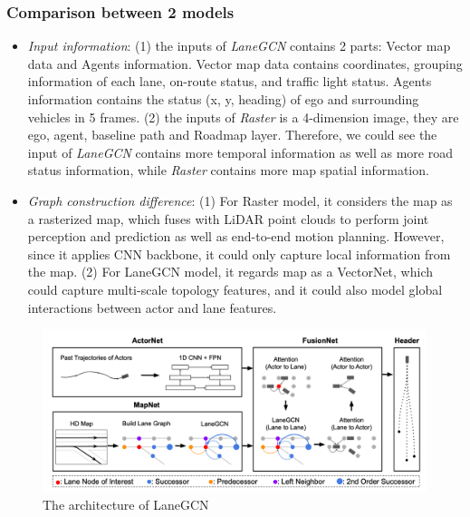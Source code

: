 \documentclass[10pt,conference,compsocconf]{IEEEtran}
\begin{document}
\subsubsection{Comparison between 2 models}

\begin{itemize}
    \item \emph{Input information}:
(1) the inputs of \emph{LaneGCN} contains 2 parts: Vector map data and Agents information. Vector map data contains coordinates, grouping information of each lane, on-route status, and traffic light status. Agents information contains the status (x, y, heading) of ego and surrounding 
vehicles in 5 frames. (2) the inputs of \emph{Raster} is a 4-dimension image, they are ego, agent, baseline path and Roadmap layer. Therefore, we could see the input of \emph{LaneGCN} contains more temporal information as well as more road status information, while \emph{Raster} contains more map spatial information.

\item \emph{Graph construction difference}: (1) For Raster model, it considers the map as a rasterized map, which fuses with LiDAR point clouds to perform joint perception and prediction as well as end-to-end motion planning. However, since it applies CNN backbone, it could only capture local information from the map. (2) For LaneGCN model, it regards map as a VectorNet, which could capture multi-scale topology features, and it could also model global interactions between actor and lane features.
\end{itemize}












\begin{figure}[!ht]
	\centering
	\includegraphics[width=0.9\linewidth]{LaneGCN.png}
	\caption{The architecture of LaneGCN}
    \label{fig:LaneGCN}
\end{figure}
\end{document}
